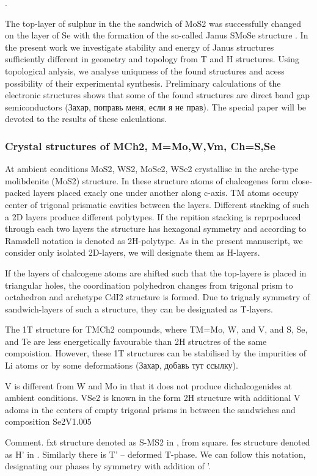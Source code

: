 .\documentclass[a4paperm]{article}
\begin{document}
The top-layer of sulphur in the the sandwich of MoS2 was successfully changed on the layer of Se with the formation of the so-called Janus SMoSe structure  \cite{lu2017}.
In the present work we investigate stability and energy of Janus structures sufficiently different in geometry and topology from T and H structures.
Using topological anlysis, we analyse uniquness of the found structures and acess possibility of their experimental synthesis.
Preliminary calculations of the electronic structures shows that some of the found structures are direct band gap semiconductors (Захар, поправь меня, если я не прав).
The special paper will be devoted to the results of these calculations.

\subsubsection*{Crystal structures of MCh2, M=Mo,W,Vm, Ch=S,Se}
At ambient conditions MoS2, WS2, MoSe2, WSe2 crystallise in the arche-type molibdenite (MoS2) structure.
In these structure atoms of chalcogenes form close-packed layers placed exacly one under another along c-axis.
TM atoms occupy center of trigonal prismatic cavities between the layers.
Different stacking of such a 2D layers produce different polytypes.
If the repition stacking is reprpoduced through each two layers the structure has hexagonal symmetry and according to Ramsdell notation is denoted as 2H-polytype. 
As in the present manuscript, we consider only isolated 2D-layers, we will designate them as H-layers.

If the layers of chalcogene atoms are shifted such that the top-layere is placed in triangular holes, the coordination polyhedron changes from trigonal prism to octahedron and archetype CdI2 structure is formed. 
Due to trignaly symmetry of sandwich-layers of such a structure, they can be designated as T-layers.

The 1T structure for TMCh2 compounds, where TM=Mo, W, and V, and S, Se, and Te are less energetically favourable than 2H structres of the same compoistion.
However, these 1T structures can be stabilised by the impurities of Li atoms or by some deformations (Захар, добавь тут ссылку).

V is different from W and Mo in that it does not produce dichalcogenides at ambient conditions.
VSe2 is known in the form 2H structure with additional V adoms in the centers of empty trigonal prisms in between the sandwiches and composition Se2V1.005

Comment. 
fxt structure denoted as S-MS2 in \cite{tang2021_smose}, from square.
fes structure denoted as H' in \cite{ma2016_h'}.
Similarly there is T' – deformed T-phase.
We can follow this notation, designating our phases by symmetry with addition of '.
\end{document}
